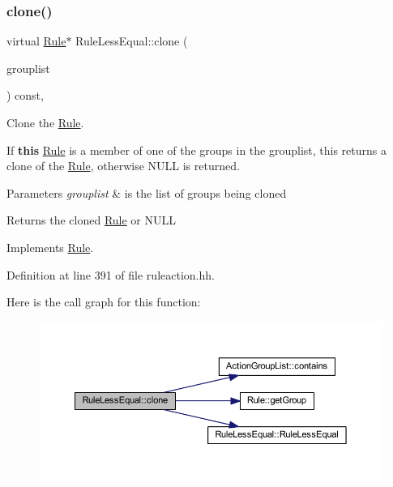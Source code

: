 \subsubsection{\texorpdfstring{clone()}{clone()}}
{\footnotesize\ttfamily virtual \mbox{\hyperlink{class_rule}{Rule}}$\ast$ Rule\+Less\+Equal\+::clone (\begin{DoxyParamCaption}\item[{const \mbox{\hyperlink{class_action_group_list}{Action\+Group\+List}} \&}]{grouplist }\end{DoxyParamCaption}) const\hspace{0.3cm}{\ttfamily [inline]}, {\ttfamily [virtual]}}



Clone the \mbox{\hyperlink{class_rule}{Rule}}. 

If {\bfseries{this}} \mbox{\hyperlink{class_rule}{Rule}} is a member of one of the groups in the grouplist, this returns a clone of the \mbox{\hyperlink{class_rule}{Rule}}, otherwise N\+U\+LL is returned. 
\begin{DoxyParams}{Parameters}
{\em grouplist} & is the list of groups being cloned \\
\hline
\end{DoxyParams}
\begin{DoxyReturn}{Returns}
the cloned \mbox{\hyperlink{class_rule}{Rule}} or N\+U\+LL 
\end{DoxyReturn}


Implements \mbox{\hyperlink{class_rule_a70de90a76461bfa7ea0b575ce3c11e4d}{Rule}}.



Definition at line 391 of file ruleaction.\+hh.

Here is the call graph for this function\+:
\nopagebreak
\begin{figure}[H]
\begin{center}
\leavevmode
\includegraphics[width=350pt]{class_rule_less_equal_ab4b8ad51cf9caf54df481de1346ee60f_cgraph}
\end{center}
\end{figure}
\mbox{\label{class_rule_less_equal_ad28269c12f51c77f7f3cf236eaba93ca}} 
